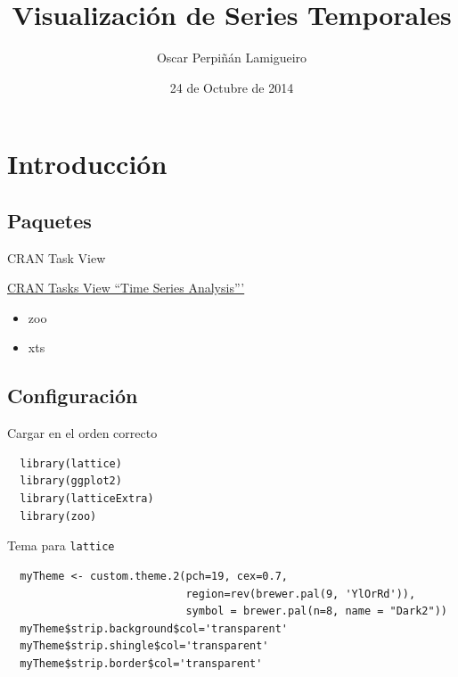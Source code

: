 \documentclass[xcolor={usenames,svgnames,dvipsnames}]{beamer}
\author{Oscar Perpiñán Lamigueiro}
\date{24 de Octubre de 2014}
\title{Visualización de Series Temporales}
\begin{document}
\maketitle

\section{Introducción}
\label{sec-1}

\subsection{Paquetes}
\label{sec-1-1}
\begin{frame}[label=sec-1-1-1]{CRAN Task View}
\begin{block}{\href{http://CRAN.R-project.org/view\%3DTimeSeries}{CRAN Tasks View ``Time Series Analysis'''}}
\begin{itemize}
\item zoo
\item xts
\end{itemize}

\cite{Ripley.Hornik2001} 
\cite{Grothendieck.Petzoldt2004}
\end{block}
\end{frame}


\subsection{Configuración}
\label{sec-1-2}
\begin{frame}[fragile,label=sec-1-2-1]{Cargar en el orden correcto}
 \lstset{language=R,label= ,caption= ,numbers=none}
\begin{lstlisting}
  library(lattice)
  library(ggplot2)
  library(latticeExtra)
  library(zoo)
\end{lstlisting}
\end{frame}
\begin{frame}[fragile,label=sec-1-2-2]{Tema para \texttt{lattice}}
 \lstset{language=R,label= ,caption= ,numbers=none}
\begin{lstlisting}
  myTheme <- custom.theme.2(pch=19, cex=0.7,
                            region=rev(brewer.pal(9, 'YlOrRd')),
                            symbol = brewer.pal(n=8, name = "Dark2"))
  myTheme$strip.background$col='transparent'
  myTheme$strip.shingle$col='transparent'
  myTheme$strip.border$col='transparent'
\end{lstlisting}
\end{frame}
\end{document}

